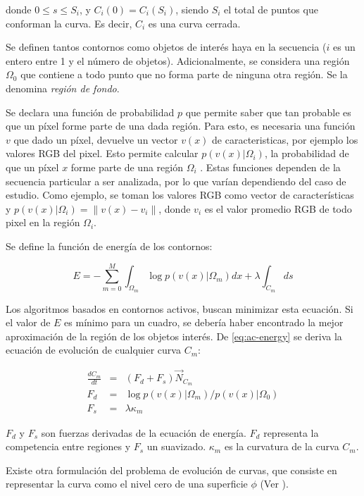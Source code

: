 \documentclass[a4paper,10pt]{article}
\begin{document}
donde $0 \leq s \leq S_i$, y $C_i(0) = C_i(S_i)$, siendo $S_i$ el total de puntos que conforman la curva.
Es decir, $C_i$ es una curva cerrada.

Se definen tantos contornos como objetos de interés haya en la secuencia ($i$ es un entero entre 1 y el número de objetos).
Adicionalmente, se considera una región $\Omega_0$ que contiene a todo punto que no forma parte de ninguna otra región.
Se la denomina \textit{región de fondo}.

Se declara una función de probabilidad $p$ que permite saber que tan probable es que un píxel forme parte de una dada región.
Para esto, es necesaria una función $v$ que dado un píxel, devuelve un vector $v(x)$ de caracteristicas, por ejemplo los valores RGB del pixel.
Esto permite calcular $p(v(x) \vert \Omega_i)$, la probabilidad de que un píxel $x$ forme parte de una región $\Omega_i$ .
Estas funciones dependen de la secuencia particular a ser analizada, por lo que varían dependiendo del caso de estudio.
Como ejemplo, se toman los valores RGB como vector de características y
$p(v(x) \vert \Omega_i) = \| v(x) - v_i \| $, donde $v_i$ es el valor promedio RGB de todo pixel en la región $\Omega_i$.

Se define la función de energía de los contornos:

\begin{equation}
    \label{eq:ac-energy}
    E = - \sum_{m=0}^{M}{\int_{\Omega_m}{\log{p(v(x) \vert \Omega_m)} dx} + \lambda \int_{C_m}{ds}}
\end{equation}

Los algoritmos basados en contornos activos, buscan minimizar esta ecuación. Si el valor de $E$ es mínimo para un cuadro, se
debería haber encontrado la mejor aproximación de la región de los objetos interés. De \ref{eq:ac-energy} se
deriva la ecuación de evolución de cualquier curva $C_m$:

\begin{eqnarray}
    \frac{dC_m}{dt} &=& (F_d + F_s) \overrightarrow{N}_{C_m} \\
    F_d &=& \log{p(v(x) \vert \Omega_m) / p(v(x) \vert \Omega_0)} \\
    F_s &=& \lambda \kappa_m \label{eq:ac-formal}
\end{eqnarray}

$F_d$ y $F_s$ son fuerzas derivadas de la ecuación de energía. $F_d$ representa la competencia entre regiones y $F_s$ un
suavizado. $\kappa_m$ es la curvatura de la curva $C_m$.

Existe otra formulación del problema de evolución de curvas, que consiste en
representar la curva como el nivel cero de una superficie $\phi$ (Ver \cite{Osher88}).
\end{document}
